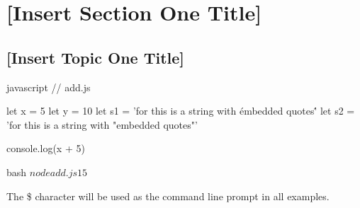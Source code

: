 \documentclass[../workbook]{subfiles}
\begin{document}
\section{[Insert Section One Title]}




\subsection{[Insert Topic One Title]}


\begin{codeblock}{javascript}
// add.js

let x = 5
let y = 10
let s1 = 'for this is a string with \'embedded quotes\''
let s2 = 'for this is a string with "embedded quotes"'

console.log(x + 5) 
\end{codeblock}

\begin{codeblock}{bash}
$ node add.js
15
$
\end{codeblock}

\begin{displaynote}
The \$ character will be used as the command line prompt in all examples.
\end{displaynote}

\end{document}
